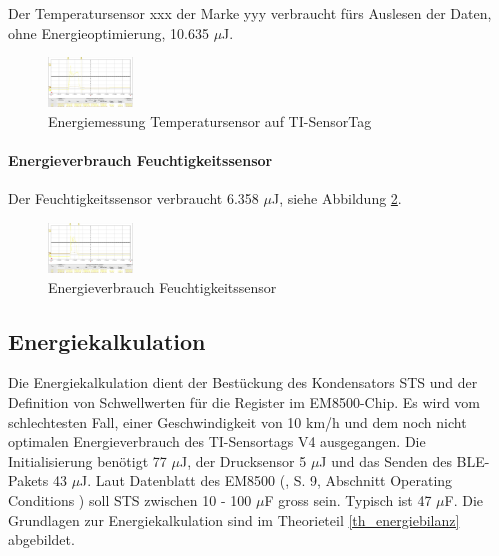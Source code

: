 Der Temperatursensor xxx der Marke yyy verbraucht fürs Auslesen der Daten, ohne Energieoptimierung, 10.635 $\mu$J.

\begin{figure}[ht]
  \includegraphics[width=0.2\textwidth]{3Vorgehen/imag/tempSensor.png}
  \caption{Energiemessung Temperatursensor auf TI-SensorTag}
  \label{energie_tempsensor}
\end{figure}


\paragraph{Energieverbrauch Feuchtigkeitssensor}

Der Feuchtigkeitssensor verbraucht 6.358 $\mu$J, siehe Abbildung \ref{energie_humidity}.

\begin{figure}
  \includegraphics[width=0.2\textwidth]{3Vorgehen/imag/Humidity.png}
  \caption{Energieverbrauch Feuchtigkeitssensor}
  \label{energie_humidity}
\end{figure}


\newpage


\subsection{Energiekalkulation}
\label{v_e_kalkulation}

Die Energiekalkulation dient der Bestückung des Kondensators STS und der Definition von Schwellwerten für die Register im EM8500-Chip. Es wird vom schlechtesten  Fall, einer Geschwindigkeit von 10 km/h und dem noch nicht optimalen Energieverbrauch des TI-Sensortags V4 ausgegangen. Die Initialisierung benötigt 77 $\mu$J, der Drucksensor 5 $\mu$J und das Senden des BLE-Pakets 43 $\mu$J. Laut Datenblatt des EM8500 (\cite{datasheet_EM85}, S. 9, Abschnitt Operating Conditions ) soll STS zwischen 10 - 100 $\mu$F gross sein. Typisch ist 47 $\mu$F. Die Grundlagen zur Energiekalkulation sind im Theorieteil \ref{th_energiebilanz} abgebildet. 

